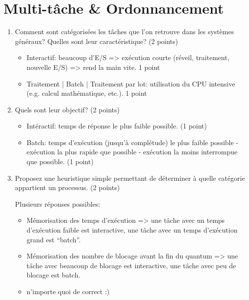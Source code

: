 \section{{Multi-tâche \& Ordonnancement}
         {\hfill{} }}

\begin{enumerate}

\item Comment sont catégorisées les tâches que l'on retrouve dans les systèmes généraux? Quelles sont leur caractéristique? (2 points)

\begin{correction}
\begin{itemize}
  \item Interactif: beaucoup d'E/S => exécution courte (réveil, traitement, nouvelle E/S) => rend la main vite.  1 point
  \item Traitement | Batch | Traitement par lot: utilisation du CPU intensive (e.g. calcul mathématique, etc.). 1 point
\end{itemize}
\end{correction}


\item Quels sont leur objectif? (2 points)

\begin{correction}
\begin{itemize}
  \item Intéractif: temps de réponse le plus faible possible. (1 point)
  \item Batch: temps d'exécution (jusqu'à complétude) le plus faible possible - exécution la plus rapide que possible - exécution la moins interrompue que possible. (1 point)
\end{itemize}
\end{correction}


\item Proposez une heuristique simple permettant de déterminer à quelle catégorie appartient un processus. (2 points)

\begin{correction}
Plusieurs réponses possibles:
\begin{itemize}
  \item Mémorisation des temps d'exécution => une tâche avec un temps d'exécution faible est interactive, une tâche avec un temps d'exécution grand est “batch”.
  \item Mémorisation des nombre de blocage avant la fin du quantum => une tâche avec beaucoup de blocage est interactive, une tâche avec peu de blocage est batch.
  \item n'importe quoi de correct :)
\end{itemize}
\end{correction}



\end{enumerate}
